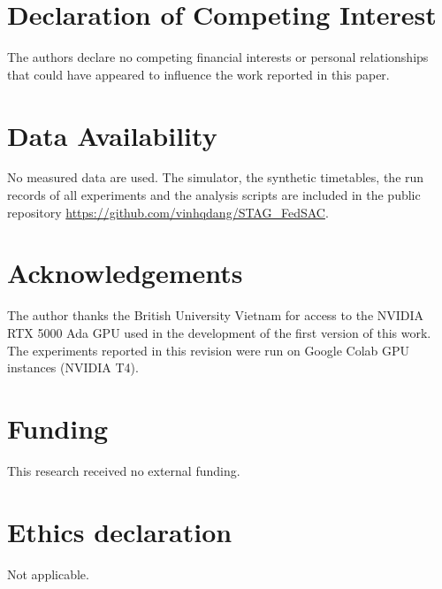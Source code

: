 


\section*{Declaration of Competing Interest}
The authors declare no competing financial interests or personal relationships
that could have appeared to influence the work reported in this paper.

\section*{Data Availability}
No measured data are used. The simulator, the synthetic timetables, the run records of all experiments and the analysis scripts are included in the public repository \url{https://github.com/vinhqdang/STAG_FedSAC}.

\section*{Acknowledgements}
The author thanks the British University Vietnam for access to the NVIDIA RTX 5000 Ada GPU used in the development of the first version of this work. The experiments reported in this revision were run on Google Colab GPU instances (NVIDIA T4).

\section*{Funding}
This research received no external funding.

\section*{Ethics declaration}
Not applicable.
